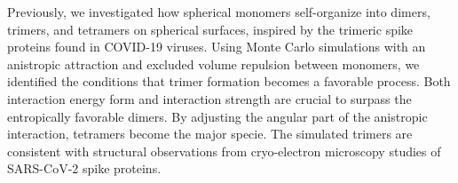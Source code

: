 \documentclass[12pt]{article}
\begin{document}
\begin{flushleft}

Previously, we investigated how spherical monomers self-organize into dimers, trimers, and tetramers on spherical surfaces, inspired by the trimeric spike proteins found in COVID-19 viruses. Using Monte Carlo simulations with an anistropic attraction and excluded volume repulsion between monomers, we identified the conditions that trimer formation becomes a favorable process. Both interaction energy form and interaction strength are crucial to surpass the entropically favorable dimers.  By adjusting the angular part of the anistropic interaction, tetramers become the major specie. The simulated trimers are consistent with structural observations from cryo-electron microscopy studies of SARS-CoV-2 spike proteins\cite{Ke2020}. 



\end{flushleft}
\end{document}
